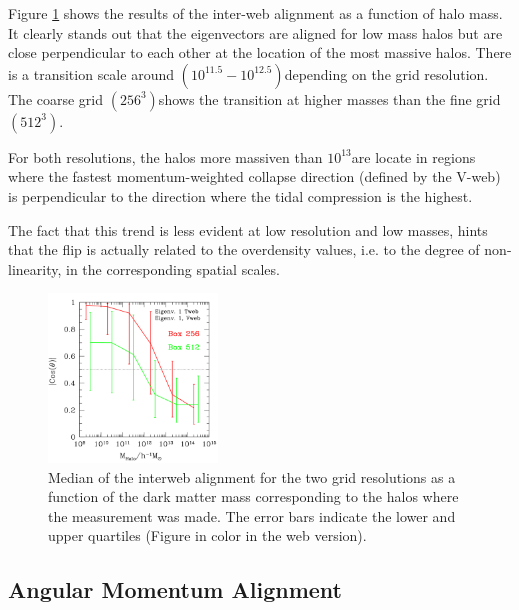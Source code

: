 \documentclass[usenatbib]{mn2e}
\newcommand{\hMsun}{{\ifmmode{h^{-1}{\rm
        {M_{\odot}}}}\else{$h^{-1}{\rm{M_{\odot}}}$}\fi}}
\begin{document}
Figure \ref{fig:interweb} shows the results of the inter-web alignment
as a function of halo mass. It clearly stands out that the
eigenvectors are aligned for low mass halos but are close perpendicular to
each other at the location of the most massive halos. There is a
transition scale around $(10^{11.5}-10^{12.5})$\hMsun depending on the
grid resolution. The coarse grid $(256^3)$shows the transition at higher masses
than the fine grid $(512^3)$.  


For both resolutions, the halos more massiven than $10^{13}$\hMsun are
locate in regions where the fastest momentum-weighted collapse
direction (defined by the V-web) is perpendicular to the direction
where the tidal compression is the highest. 

The fact that this trend is less evident at low resolution and low
masses, hints that the flip is actually related to the overdensity
values, i.e. to the degree of non-linearity, in the corresponding
spatial scales.





\begin{figure}
\includegraphics[width=0.40\textwidth]{web.pdf}
\caption{Median of the interweb alignment for the two grid
  resolutions as a function of the dark matter mass corresponding to
  the halos where the measurement was made. The error bars indicate
  the lower and upper quartiles (Figure in color in the web version).
\label{fig:interweb}} 
\end{figure}

\subsection{Angular Momentum Alignment}
\end{document}
